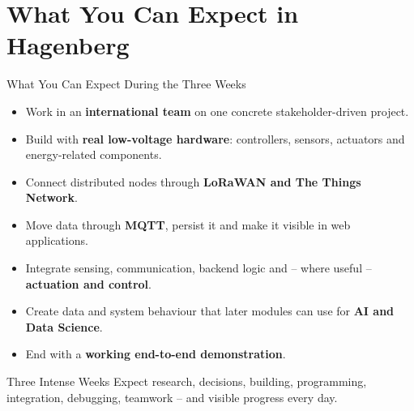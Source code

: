 \part[nopartpage]{What You Can Expect in Hagenberg}

\begin{frame}{What You Can Expect During the Three Weeks}
\begin{itemize}
    \item Work in an \textbf{international team} on one concrete stakeholder-driven project.
    \item Build with \textbf{real low-voltage hardware}: controllers, sensors, actuators and energy-related components.
    \item Connect distributed nodes through \textbf{LoRaWAN and The Things Network}.
    \item Move data through \textbf{MQTT}, persist it and make it visible in web applications.
    \item Integrate sensing, communication, backend logic and -- where useful -- \textbf{actuation and control}.
    \item Create data and system behaviour that later modules can use for \textbf{AI and Data Science}.
    \item End with a \textbf{working end-to-end demonstration}.
\end{itemize}
\begin{alertblock}{Three Intense Weeks}
Expect research, decisions, building, programming, integration, debugging, teamwork -- and visible progress every day.
\end{alertblock}
\end{frame}
